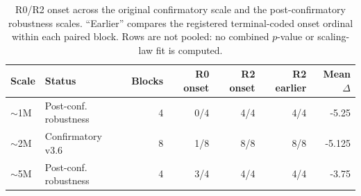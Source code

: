 \begin{table}[t]
\caption{R0/R2 onset across the original confirmatory scale and the
post-confirmatory robustness scales. ``Earlier'' compares the registered
terminal-coded onset ordinal within each paired block. Rows are not pooled: no
combined $p$-value or scaling-law fit is computed.}
\label{tab:scale-robustness-main}
\centering
\footnotesize
\begin{tabular}{llrrrrr}
\toprule
Scale & Status & Blocks & R0 onset & R2 onset & R2 earlier & Mean $\Delta$ \\
\midrule
$\sim$1M & Post-conf. robustness & 4 & 0/4 & 4/4 & 4/4 & -5.25 \\
$\sim$2M & Confirmatory v3.6 & 8 & 1/8 & 8/8 & 8/8 & -5.125 \\
$\sim$5M & Post-conf. robustness & 4 & 3/4 & 4/4 & 4/4 & -3.75 \\
\bottomrule
\end{tabular}
\end{table}

